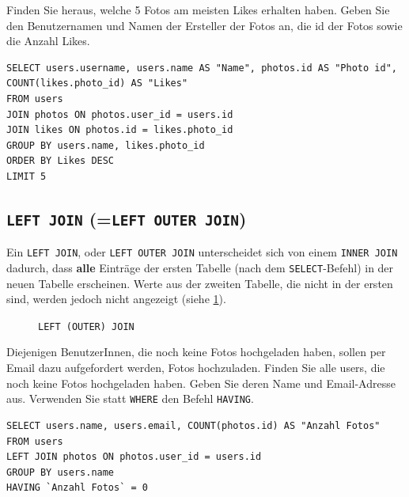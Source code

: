 \begin{mychallenge}
  Finden Sie heraus, welche 5 Fotos am meisten Likes erhalten haben. Geben Sie den Benutzernamen und Namen der Ersteller der Fotos an, die id der Fotos sowie die Anzahl Likes.
  \begin{myanswer}
    \begin{lstlisting}
SELECT users.username, users.name AS "Name", photos.id AS "Photo id", COUNT(likes.photo_id) AS "Likes"
FROM users
JOIN photos ON photos.user_id = users.id
JOIN likes ON photos.id = likes.photo_id
GROUP BY users.name, likes.photo_id
ORDER BY Likes DESC
LIMIT 5
\end{lstlisting}
  \end{myanswer}

\end{mychallenge}

\subsection{\texorpdfstring{\lstinline|LEFT JOIN| (=\lstinline|LEFT OUTER JOIN|)}{LEFT JOIN (=LEFT OUTER JOIN)}}
Ein \lstinline|LEFT JOIN|, oder \lstinline|LEFT OUTER JOIN| unterscheidet sich von einem \lstinline|INNER JOIN| dadurch, dass \textbf{alle} Einträge der ersten Tabelle (nach dem \lstinline|SELECT|-Befehl) in der neuen Tabelle erscheinen. Werte aus der zweiten Tabelle, die nicht in der ersten sind, werden jedoch nicht angezeigt (siehe \cref{fig:venn-left-join}).

\begin{figure}[H]
  \centering
  \caption{\lstinline|LEFT (OUTER) JOIN|}
  \label{fig:venn-left-join}
\end{figure}

\begin{myexercise}
  Diejenigen BenutzerInnen, die noch keine Fotos hochgeladen haben, sollen per Email dazu aufgefordert werden, Fotos hochzuladen. Finden Sie alle users, die noch keine Fotos hochgeladen haben. Geben Sie deren Name und Email-Adresse aus. Verwenden Sie statt \lstinline|WHERE| den Befehl \lstinline|HAVING|.
  \begin{myanswer}
    \begin{lstlisting}
SELECT users.name, users.email, COUNT(photos.id) AS "Anzahl Fotos"
FROM users
LEFT JOIN photos ON photos.user_id = users.id
GROUP BY users.name
HAVING `Anzahl Fotos` = 0
\end{lstlisting}
  \end{myanswer}
\end{myexercise}


